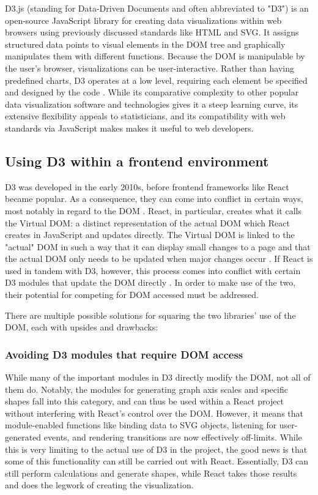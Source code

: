 D3.js (standing for Data-Driven Documents and often abbreviated to "D3") is an open-source JavaScript library for creating data visualizations within web browsers using previously discussed standards like HTML and SVG. It assigns structured data points to visual elements in the DOM tree and graphically manipulates them with different functions. Because the DOM is manipulable by the user's browser, visualizations can be user-interactive. Rather than having predefined charts, D3 operates at a low level, requiring each element be specified and designed by the code \cite{meeks_d3js_2024}. While its comparative complexity to other popular data visualization software and technologies gives it a steep learning curve, its extensive flexibility appeals to statisticians, and its compatibility with web standards via JavaScript makes makes it useful to web developers.

\subsection{Using D3 within a frontend environment}\label{d3react}

D3 was developed in the early 2010s, before frontend frameworks like React became popular. As a consequence, they can come into conflict in certain ways, most notably in regard to the DOM \cite{meeks_d3js_2024}. React, in particular, creates what it calls the Virtual DOM: a distinct representation of the actual DOM which React creates in JavaScript and updates directly. The Virtual DOM is linked to the "actual" DOM in such a way that it can display small changes to a page and that the actual DOM only needs to be updated when major changes occur \cite{adedeji_full-stack_2023}. If React is used in tandem with D3, however, this process comes into conflict with certain D3 modules that update the DOM directly \cite{meeks_d3js_2024}. In order to make use of the two, their potential for competing for DOM accessed must be addressed.

There are multiple possible solutions for squaring the two libraries' use of the DOM, each with upsides and drawbacks:

\subsubsection{Avoiding D3 modules that require DOM access}

While many of the important modules in D3 directly modify the DOM, not all of them do. Notably, the modules for generating graph axis scales and specific shapes fall into this category, and can thus be used within a React project without interfering with React's control over the DOM. However, it means that module-enabled functions like binding data to SVG objects, listening for user-generated events, and rendering transitions are now effectively off-limits. While this is very limiting to the actual use of D3 in the project, the good news is that some of this functionality can still be carried out with React. Essentially, D3 can still perform calculations and generate shapes, while React takes those results and does the legwork of creating the visualization.

